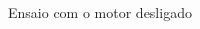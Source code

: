 \documentclass{beamer}
\begin{document}
\begin{frame}
\begin{columns}
\begin{column}{0.5\textwidth}
\begin{block}{Ensaio com o motor desligado}
		
		\begin{center}
		\end{center}
	\end{block}
	\end{column}
\end{columns}
\end{frame}
\end{document}
